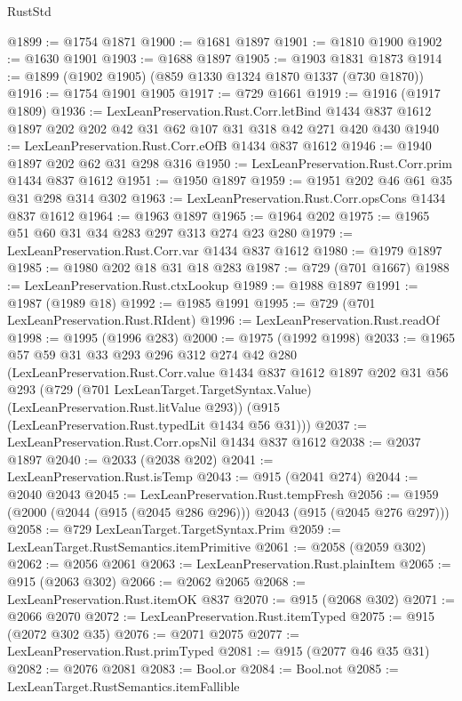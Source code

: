 \begin{lexlean}{RustStd}
\begin{coremodule}
@1899 := @1754 @1871
@1900 := @1681 @1897
@1901 := @1810 @1900
@1902 := @1630 @1901
@1903 := @1688 @1897
@1905 := @1903 @1831 @1873
@1914 := @1899 (@1902 @1905) (@859 @1330 @1324 @1870 @1337 (@730 @1870))
@1916 := @1754 @1901 @1905
@1917 := @729 @1661
@1919 := @1916 (@1917 @1809)
@1936 := LexLeanPreservation.Rust.Corr.letBind
    @1434
    @837
    @1612
    @1897
    @202
    @202
    @42
    @31
    @62
    @107
    @31
    @318
    @42
    @271
    @420
    @430
@1940 := LexLeanPreservation.Rust.Corr.eOfB @1434 @837 @1612
@1946 := @1940 @1897 @202 @62 @31 @298 @316
@1950 := LexLeanPreservation.Rust.Corr.prim @1434 @837 @1612
@1951 := @1950 @1897
@1959 := @1951 @202 @46 @61 @35 @31 @298 @314 @302
@1963 := LexLeanPreservation.Rust.Corr.opsCons @1434 @837 @1612
@1964 := @1963 @1897
@1965 := @1964 @202
@1975 := @1965 @51 @60 @31 @34 @283 @297 @313 @274 @23 @280
@1979 := LexLeanPreservation.Rust.Corr.var @1434 @837 @1612
@1980 := @1979 @1897
@1985 := @1980 @202 @18 @31 @18 @283
@1987 := @729 (@701 @1667)
@1988 := LexLeanPreservation.Rust.ctxLookup
@1989 := @1988 @1897
@1991 := @1987 (@1989 @18)
@1992 := @1985 @1991
@1995 := @729 (@701 LexLeanPreservation.Rust.RIdent)
@1996 := LexLeanPreservation.Rust.readOf
@1998 := @1995 (@1996 @283)
@2000 := @1975 (@1992 @1998)
@2033 := @1965
    @57
    @59
    @31
    @33
    @293
    @296
    @312
    @274
    @42
    @280
    (LexLeanPreservation.Rust.Corr.value
      @1434
      @837
      @1612
      @1897
      @202
      @31
      @56
      @293
      (@729 (@701 LexLeanTarget.TargetSyntax.Value) (LexLeanPreservation.Rust.litValue @293))
      (@915 (LexLeanPreservation.Rust.typedLit @1434 @56 @31)))
@2037 := LexLeanPreservation.Rust.Corr.opsNil @1434 @837 @1612
@2038 := @2037 @1897
@2040 := @2033 (@2038 @202)
@2041 := LexLeanPreservation.Rust.isTemp
@2043 := @915 (@2041 @274)
@2044 := @2040 @2043
@2045 := LexLeanPreservation.Rust.tempFresh
@2056 := @1959 (@2000 (@2044 (@915 (@2045 @286 @296))) @2043 (@915 (@2045 @276 @297)))
@2058 := @729 LexLeanTarget.TargetSyntax.Prim
@2059 := LexLeanTarget.RustSemantics.itemPrimitive
@2061 := @2058 (@2059 @302)
@2062 := @2056 @2061
@2063 := LexLeanPreservation.Rust.plainItem
@2065 := @915 (@2063 @302)
@2066 := @2062 @2065
@2068 := LexLeanPreservation.Rust.itemOK @837
@2070 := @915 (@2068 @302)
@2071 := @2066 @2070
@2072 := LexLeanPreservation.Rust.itemTyped
@2075 := @915 (@2072 @302 @35)
@2076 := @2071 @2075
@2077 := LexLeanPreservation.Rust.primTyped
@2081 := @915 (@2077 @46 @35 @31)
@2082 := @2076 @2081
@2083 := Bool.or
@2084 := Bool.not
@2085 := LexLeanTarget.RustSemantics.itemFallible

\end{coremodule}
\end{lexlean}
